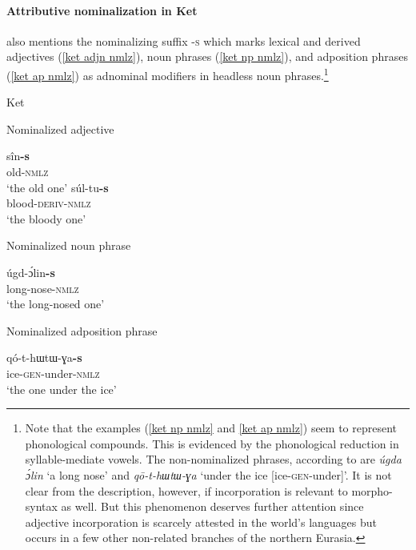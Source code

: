 \paragraph{Attributive nominalization in Ket}
\citet[15, 84–85]{vajda2004} also mentions the nominalizing suffix \textsc{-s} which marks lexical and derived adjectives (\ref{ket adjn nmlz}), noun phrases (\ref{ket np nmlz}), and adposition phrases (\ref{ket ap nmlz}) as adnominal modifiers in headless noun phrases.\footnote{Note that the examples (\ref{ket np nmlz} and \ref{ket ap nmlz}) seem to represent phonological compounds. This is evidenced by the phonological reduction in syllable-mediate vowels. The non-nominalized phrases, according to \citet{vajda2005} are \textit{úgda ɔ́lin} ‘a long nose’ and \textit{qō-t-hɯtɯ-ɣa} ‘under the ice [ice-\textsc{gen}-under]’. It is not clear from the description, however, if incorporation is relevant to morpho-syntax as well. But this phenomenon deserves further attention since adjective incorporation is scarcely attested in the world's languages but occurs in a few other non-related branches of the northern Eurasia.}
\begin{exe}
\ex 
\rm{Ket \citep{vajda2005}}
\begin{xlist}
\ex 
\label{ket adjn nmlz}
\rm{Nominalized adjective}
\begin{xlist}
\ex	
\gll	sîn\textbf{-s}\\
	old-\textsc{nmlz}\\
\glt	‘the old one’
\ex	
\gll	súl-tu\textbf{-s}\\
	blood-\textsc{deriv-nmlz}\\
\glt	‘the bloody one’
\end{xlist}

\ex	
\label{ket np nmlz}
\rm{Nominalized noun phrase}
\begin{xlist}
\ex
\gll	úgd-ɔ́lin\textbf{-s}\\
	long-nose-\textsc{nmlz}\\
\glt	‘the long-nosed one’
\end{xlist}

\ex 
\label{ket ap nmlz}
\rm{Nominalized adposition phrase}
\begin{xlist}
\ex
\gll	qó-t-{hɯtɯ-ɣa}\textbf{-s}\\
	ice-\textsc{gen}-under-\textsc{nmlz}\\
\glt	‘the one under the ice’
\end{xlist}
\end{xlist}
\end{exe}
